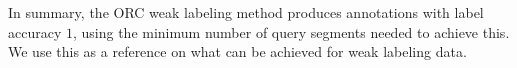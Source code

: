 In summary, the ORC weak labeling method produces annotations with label accuracy $1$, using the minimum number of query segments needed to achieve this. We use this as a reference on what can be achieved for weak labeling data.




